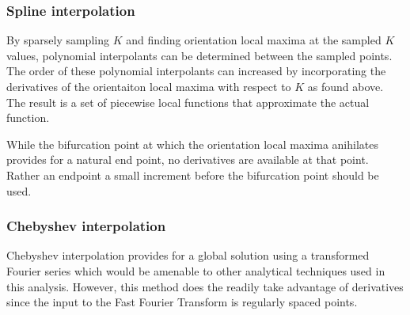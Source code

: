 \documentclass[11pt]{article} %
\begin{document}
\subsubsection{Spline interpolation}

By sparsely sampling $ K $ and finding orientation local maxima at the sampled $ K $ values, polynomial interpolants can be determined between the sampled points. The order of these polynomial interpolants can increased by incorporating the derivatives of the orientaiton local maxima with respect to $ K $ as found above. The result is a set of piecewise local functions that approximate the actual function.

While the bifurcation point at which the orientation local maxima anihilates provides for a natural end point, no derivatives are available at that point. Rather an endpoint a small increment before the bifurcation point should be used.

\subsubsection{Chebyshev interpolation}

Chebyshev interpolation provides for a global solution using a transformed Fourier series which would be amenable to other analytical techniques used in this analysis. However, this method does the readily take advantage of derivatives since the input to the Fast Fourier Transform is regularly spaced points.
\end{document}
